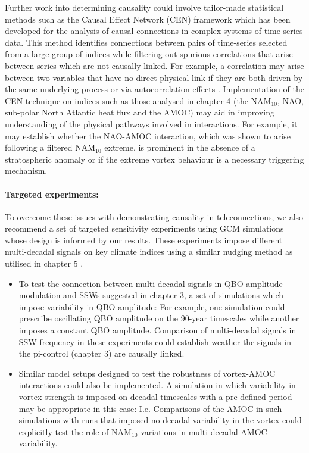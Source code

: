 Further work into determining causality could involve tailor-made statistical methods such as the Causal Effect Network (CEN) framework \citep{Kretschmer2016} which has been developed for the analysis of causal connections in complex systems of time series data. This method identifies connections between pairs of time-series selected from a large group of indices while filtering out spurious correlations that arise between series which are not causally linked. For example, a correlation may arise between two variables that have no direct physical link if they are both driven by the same underlying process or via autocorrelation effects \citep{rungeQuantifying2014}. Implementation of the CEN technique on indices such as those analysed in chapter 4 (the NAM$_{10}$, NAO, sub-polar North Atlantic heat flux and the AMOC) may aid in improving understanding of the physical pathways involved in interactions. For example, it may establish whether the NAO-AMOC interaction, which was shown to arise following a filtered NAM$_{10}$ extreme, is prominent in the absence of a stratospheric anomaly or if the extreme vortex behaviour is a necessary triggering mechanism. 

\paragraph{Targeted experiments:}
To overcome these issues with demonstrating causality in teleconnections, we also recommend a set of targeted sensitivity experiments using GCM simulations whose design is informed by our results. These experiments impose different multi-decadal signals on key climate indices using a similar nudging method as utilised in chapter 5 \citep{telfordTechnical2008}.

\begin{itemize}
    \item To test the connection between multi-decadal signals in QBO amplitude modulation and SSWs suggested in chapter 3, a set of simulations which impose variability in QBO amplitude: For example, one simulation could prescribe oscillating QBO amplitude on the 90-year timescales while another imposes a constant QBO amplitude. Comparison of multi-decadal signals in SSW frequency in these experiments could establish weather the signals in the pi-control (chapter 3) are causally linked.  
    
    \item Similar model setups designed to test the robustness of vortex-AMOC interactions could also be implemented. A simulation in which variability in vortex strength is imposed on decadal timescales with a pre-defined period may be appropriate in this case: I.e. Comparisons of the AMOC in such simulations with runs that imposed no decadal variability in the vortex could explicitly test the role of NAM$_{10}$ variations in multi-decadal AMOC variability. 
    
\end{itemize}

